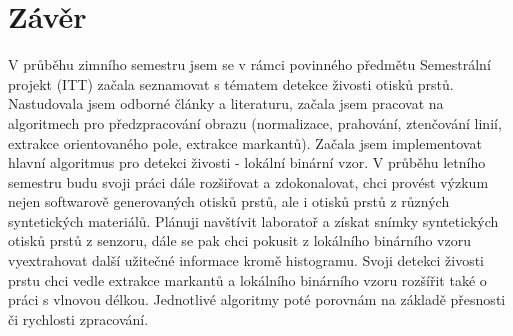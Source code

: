\label{citace}



\chapter{Závěr}
V průběhu zimního semestru jsem se v rámci povinného předmětu Semestrální projekt (ITT) začala seznamovat s tématem detekce živosti otisků prstů. Nastudovala jsem odborné články a literaturu, začala jsem pracovat na algoritmech pro předzpracování obrazu (normalizace, prahování, ztenčování linií, extrakce orientovaného pole, extrakce markantů). Začala jsem implementovat hlavní algoritmus pro detekci živosti - lokální binární vzor. V průběhu letního semestru budu svoji práci dále rozšiřovat a zdokonalovat, chci provést výzkum nejen softwarově generovaných otisků prstů, ale i otisků prstů z různých syntetických materiálů. Plánuji navštívit laboratoř a získat snímky syntetických otisků prstů z senzoru, dále se pak chci pokusit z lokálního binárního vzoru vyextrahovat další užitečné informace kromě histogramu. Svoji detekci živosti prstu chci vedle extrakce markantů a lokálního binárního vzoru rozšířit také o práci s vlnovou délkou. Jednotlivé algoritmy poté porovnám na základě přesnosti či rychlosti zpracování. 

\label{zaver}


